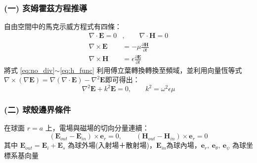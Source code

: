 \subsubsection*{(一) 亥姆霍茲方程推導}
自由空間中的馬克示威方程式有四條：
\begin{align}
    \nabla \cdot \mathbf{E} = 0 &, \qquad \nabla \cdot \mathbf{H} = 0 \label{eq:no_div}\\
    \nabla \times \mathbf{E} &= -\mu \frac{\partial \mathbf{H}}{\partial t} \\
    \nabla \times \mathbf{H} &= \epsilon \frac{\partial \mathbf{E}}{\partial t} \label{eq:h_func}
\end{align}
將式 \eqref{eq:no_div}$\sim$\eqref{eq:h_func} 利用傅立葉轉換轉換至頻域，並利用向量恆等式 \(\nabla \times \left( \nabla \mathbf{E} \right) = \nabla \left( \nabla \cdot \mathbf{E} \right) - \nabla^2 \mathbf{E}\)即可得出：
\begin{equation}
\nabla^2\mathbf{E} + k^2 \mathbf{E} = 0, \qquad k^2 = \omega^2 \epsilon \mu \label{eq:hem}
\end{equation}

\subsubsection*{(二) 球殼邊界條件}
在球面 $r=a$ 上，電場與磁場的切向分量連續：
\begin{equation}
    \left(\mathbf{E}_{out} - \mathbf{E}_{in}\right) \times \mathbf{e}_r = 0, \qquad \left(\mathbf{H}_{out} - \mathbf{H}_{in}\right) \times \mathbf{e}_r = 0
\end{equation}
其中 \(\mathbf{E}_{out} = \mathbf{E}_{i} + \mathbf{E}_{s}\) 為球外場(入射場＋散射場)，\(\mathbf{E}_{in}\)為球內場，\(\mathbf{e}_r,\ \mathbf{e}_{\theta},\ \mathbf{e}_{\psi}\) 為球坐標系基向量

